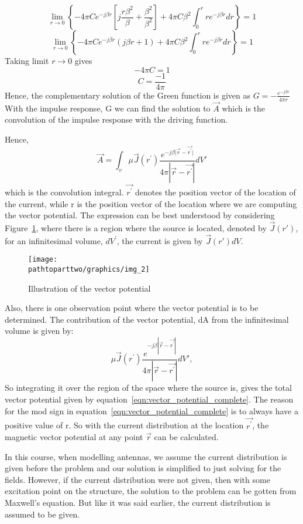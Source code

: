 \begin{dmath*}
\lim\limits_{r\rightarrow0} \left\lbrace-4\pi C e^{-j\beta r}\left[j\frac{r\beta^{2}}{\beta} +\frac{\beta^{2}}{\beta^{2}}\right] + 4\pi C\beta^{2}\int_{0}^{r}re^{-j\beta r}dr\right\rbrace = 1
\end{dmath*}
\begin{dmath*}
\lim\limits_{r\rightarrow0} \left\lbrace-4\pi C e^{-j\beta r}(j\beta r+1) + 4\pi C\beta^{2}\int_{0}^{r}re^{-j\beta r}dr\right\rbrace = 1
\end{dmath*}
Taking limit $r\rightarrow0$ gives
$$-4\pi C= 1$$
$$C = \frac{-1}{4\pi}$$
Hence, the complementary solution of the Green function is given as $ G= -\frac{e^{-j\beta r}}{4\pi r}$
With the impulse response, G we can find the solution to $\vec{A}$ which is the convolution of the impulse response with the driving function.

Hence, 
\begin{equation}
\vec{A}=\int_{v}\mu\vec{J}(r^{'}) \frac{e^{-j\beta\vert\vec{r}-\vec{r^{'}}\vert}}{4\pi|\vec{r}-\vec{r^{'}}|}dV'
\label{eqn:vector_potential_complete}
\end{equation}
which is the convolution integral. $\vec{r^{'}}$ denotes the position vector of the location of the current, while r is the position vector of the location where we are computing the vector potential. The expression can be best understood by considering Figure~\ref{fig:img_2}, where there is a region where the source is located, denoted by $\vec{J}(r')$, for an infinitesimal volume, $dV^{'}$, the current is given by $\vec{J}(r')dV$.
\begin{figure}[h]
\centering
\texttt{[image: \\pathtoparttwo/graphics/img\_2]}
\caption{Illustration of the vector potential}
\label{fig:img_2}
\end{figure}

Also, there is one observation point where the vector potential is to be determined. The contribution of the vector potential, dA from the infinitesimal volume is given by: 
\begin{equation}
\mu\vec{J}(r^{'}) \frac{e^{-j\beta|\vec{r}-\vec{r^{'}}|}}{4\pi|\vec{r}-\vec{r^{'}}|}dV',
\end{equation}
So integrating it over the region of the space where the source is, gives the total vector potential given by equation~\eqref{eqn:vector_potential_complete}. The reason for the mod sign in equation~\eqref{eqn:vector_potential_complete} is to always have a positive value of r. So with the current distribution at the location $\vec{r^{'}}$, the magnetic vector potential at any point $\vec{r}$ can be calculated.

In this course, when modelling antennas, we assume the current distribution is given before the problem and our solution is simplified to just solving for the fields. However, if the current distribution were not given, then with some excitation point on the structure, the solution to the problem can be gotten from Maxwell's equation. But like it was said earlier, the current distribution is assumed to be given.
